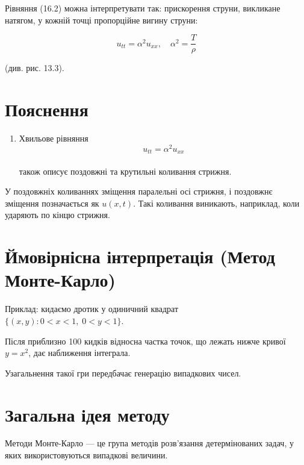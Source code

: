 \documentclass[
  ukrainian,
]{article}
\providecommand{\tightlist}{%
  \setlength{\itemsep}{0pt}\setlength{\parskip}{0pt}}
\begin{document}
Рівняння (16.2) можна інтерпретувати так: прискорення струни, викликане
натягом, у кожній точці пропорційне вигину струни:

\[
u_{tt} = \alpha^2 u_{xx}, \quad \alpha^2 = \frac{T}{\rho}
\]

(див. рис. 13.3).

\section{Пояснення}\label{ux43fux43eux44fux441ux43dux435ux43dux43dux44f}

\begin{enumerate}
\def\labelenumi{\arabic{enumi}.}
\tightlist
\item
  Хвильове рівняння\\
  \[
  u_{tt} = \alpha^2 u_{xx}
  \]\\
  також описує поздовжні та крутильні коливання стрижня.
\end{enumerate}

У поздовжніх коливаннях зміщення паралельні осі стрижня, і поздовжнє
зміщення позначається як \(u(x,t)\). Такі коливання виникають,
наприклад, коли ударяють по кінцю стрижня.

\section{Ймовірнісна інтерпретація (Метод
Монте-Карло)}\label{ux439ux43cux43eux432ux456ux440ux43dux456ux441ux43dux430-ux456ux43dux442ux435ux440ux43fux440ux435ux442ux430ux446ux456ux44f-ux43cux435ux442ux43eux434-ux43cux43eux43dux442ux435-ux43aux430ux440ux43bux43e}

Приклад: кидаємо дротик у одиничний квадрат\\
\(\{(x, y): 0 < x < 1,\; 0 < y < 1\}\).

Після приблизно 100 кидків відносна частка точок, що лежать нижче кривої
\(y = x^2\), дає наближення інтеграла.

Узагальнення такої гри передбачає генерацію випадкових чисел.

\section{Загальна ідея
методу}\label{ux437ux430ux433ux430ux43bux44cux43dux430-ux456ux434ux435ux44f-ux43cux435ux442ux43eux434ux443}

Методи Монте-Карло --- це група методів розв'язання детермінованих
задач, у яких використовуються випадкові величини.
\end{document}

